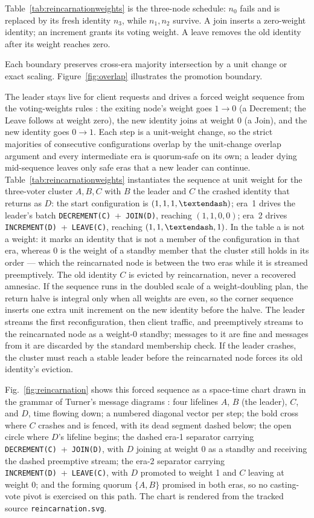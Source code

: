 \documentclass[10pt,journal,letterpaper]{IEEEtran}
\newcommand{\code}[1]{\texttt{#1}}
\begin{document}
Table~\ref{tab:reincarnationweights} is the three-node schedule: $n_0$ fails and is replaced by its fresh identity $n_3$, while $n_1,n_2$ survive. A join inserts a zero-weight identity; an increment grants its voting weight. A leave removes the old identity after its weight reaches zero.

Each boundary preserves cross-era majority intersection by a unit change or exact scaling. Figure~\ref{fig:overlap} illustrates the promotion boundary.

The leader stays live for client requests and drives a forced weight sequence from
the voting-weights rules \cite{votingweights}: the exiting node's weight goes
$1\to0$ (a Decrement; the Leave follows at weight zero), the new identity joins at weight $0$ (a Join), and the new
identity goes $0\to1$. Each step
is a unit-weight change, so the strict majorities of consecutive configurations
overlap by the unit-change overlap argument and every intermediate era is
quorum-safe on its own; a leader dying mid-sequence leaves only safe eras that a
new leader can continue. Table~\ref{tab:reincarnationweights} instantiates the
sequence at unit weight for the three-voter cluster $A,B,C$ with $B$ the leader
and $C$ the crashed identity that returns as $D$: the start configuration is
$(1,1,1,\textendash)$; era~1 drives the leader's batch
\code{DECREMENT(C)}~+~\code{JOIN(D)}, reaching $(1,1,0,0)$; era~2 drives
\code{INCREMENT(D)}~+~\code{LEAVE(C)}, reaching $(1,1,\textendash,1)$. In the
table a \textendash{} is not a weight: it marks an identity that is not a member
of the configuration in that era, whereas $0$ is the weight of a standby member
that the cluster still holds in its order --- which the reincarnated node is
between the two eras while it is streamed preemptively. The old identity $C$ is
evicted by reincarnation, never a recovered amnesiac. If the sequence
runs in the doubled scale of a weight-doubling
plan, the return halve is integral only when all weights are even, so the corner
sequence inserts one extra unit increment on the new identity before the halve. The
leader streams the first reconfiguration, then client traffic, and preemptively
streams to the reincarnated node as a weight-0 standby; messages to it are fine and
messages from it are discarded by the standard membership check. If the leader crashes,
the cluster must reach a stable leader before the reincarnated node forces its old
identity's eviction.

Fig.~\ref{fig:reincarnation} shows this forced sequence as a space-time chart
drawn in the grammar of Turner's message diagrams \cite{turner}: four
lifelines $A$, $B$ (the leader), $C$, and $D$, time flowing down; a numbered
diagonal vector per step; the bold cross where $C$ crashes and is fenced,
with its dead segment dashed below; the open circle where $D$'s lifeline
begins; the dashed era-1 separator carrying \code{DECREMENT(C)}~+~\code{JOIN(D)},
with $D$ joining at weight 0 as a standby and receiving the dashed
preemptive stream; the era-2 separator carrying \code{INCREMENT(D)}~+~\code{LEAVE(C)},
with $D$ promoted to weight 1 and $C$ leaving at weight 0; and the forming
quorum $\{A,B\}$ promised in both eras, so no casting-vote pivot is
exercised on this path. The chart is rendered from the tracked source
\code{reincarnation.svg}.
\end{document}
